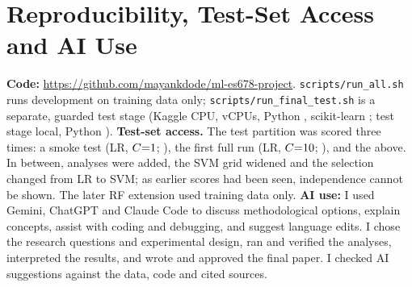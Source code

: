 \documentclass{article}
\begin{document}
\section{Reproducibility, Test-Set Access and AI Use}
\label{sec:repro}
\textbf{Code:} \url{https://github.com/mayankdode/ml-es678-project}. \texttt{scripts/run\_all.sh} runs development on training data only; \texttt{scripts/run\_final\_test.sh} is a separate, guarded test stage (Kaggle CPU, \Nncpu{} vCPUs, Python \Npyver, scikit-learn \Nsklearn; test stage local, Python \Npyvertest).
\textbf{Test-set access.} The test partition was scored three times: a smoke test (LR, $C{=}1$; \Nsmoketestf), the first full run (LR, $C{=}10$; \Nrunonetestf), and the \Nselmodel{} above. In between, analyses were added, the SVM grid widened and the selection changed from LR to SVM; as earlier scores had been seen, independence cannot be shown. The later RF extension used training data only.
\textbf{AI use:} I used Gemini, ChatGPT and Claude Code to discuss methodological options, explain concepts, assist with coding and debugging, and suggest language edits. I chose the research questions and experimental design, ran and verified the analyses, interpreted the results, and wrote and approved the final paper. I checked AI suggestions against the data, code and cited sources.
\end{document}
